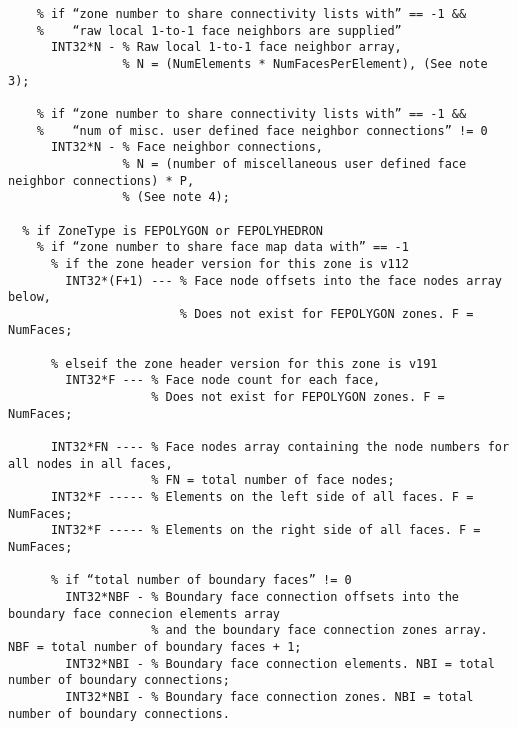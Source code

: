 \documentclass[lang=cn,11pt,a4paper]{elegantpaper}
\begin{document}
\begin{lstlisting}
    % if “zone number to share connectivity lists with” == -1 &&
    %    “raw local 1-to-1 face neighbors are supplied”
      INT32*N - % Raw local 1-to-1 face neighbor array,
                % N = (NumElements * NumFacesPerElement), (See note 3);

    % if “zone number to share connectivity lists with” == -1 &&
    %    “num of misc. user defined face neighbor connections” != 0
      INT32*N - % Face neighbor connections,
                % N = (number of miscellaneous user defined face neighbor connections) * P,
                % (See note 4);

  % if ZoneType is FEPOLYGON or FEPOLYHEDRON
    % if “zone number to share face map data with” == -1
      % if the zone header version for this zone is v112
        INT32*(F+1) --- % Face node offsets into the face nodes array below,
                        % Does not exist for FEPOLYGON zones. F = NumFaces;

      % elseif the zone header version for this zone is v191
        INT32*F --- % Face node count for each face,
                    % Does not exist for FEPOLYGON zones. F = NumFaces;

      INT32*FN ---- % Face nodes array containing the node numbers for all nodes in all faces,
                    % FN = total number of face nodes;
      INT32*F ----- % Elements on the left side of all faces. F = NumFaces;
      INT32*F ----- % Elements on the right side of all faces. F = NumFaces;

      % if “total number of boundary faces” != 0
        INT32*NBF - % Boundary face connection offsets into the boundary face connecion elements array 
                    % and the boundary face connection zones array. NBF = total number of boundary faces + 1;
        INT32*NBI - % Boundary face connection elements. NBI = total number of boundary connections;
        INT32*NBI - % Boundary face connection zones. NBI = total number of boundary connections.
\end{lstlisting}
\end{document}

